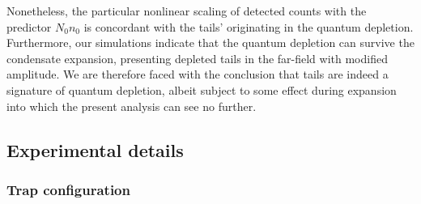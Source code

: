 
	Nonetheless, the particular nonlinear scaling of detected counts with the predictor $N_0n_0$ is concordant with the tails' originating in the quantum depletion.
	Furthermore, our simulations indicate that the quantum depletion can survive the condensate expansion, presenting depleted tails in the far-field with modified amplitude. 
	We are therefore faced with the conclusion that tails are indeed a signature of quantum depletion, albeit subject to some effect during expansion into which the present analysis can see no further.
	
	
 	
	


\subsection{Experimental details}
\label{sec:exp_details}
\subsubsection{Trap configuration}

